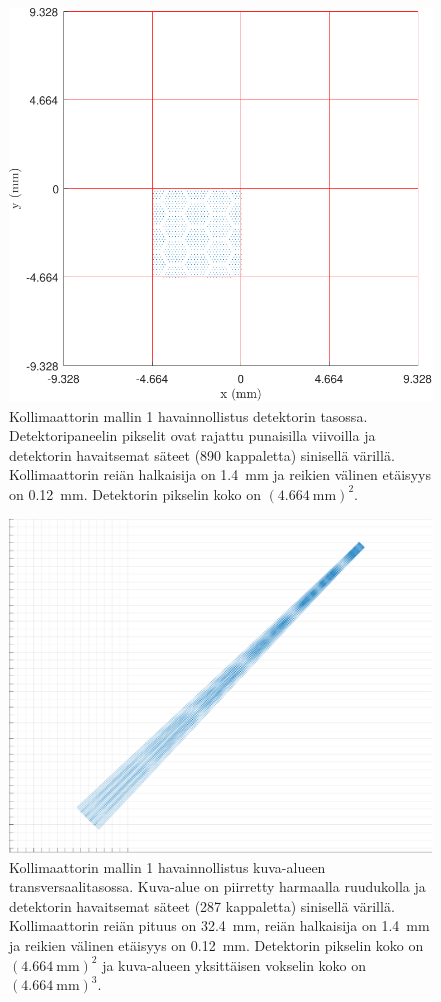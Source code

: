 \begin{figure}[H]
    \centering
    \captionsetup{width=.9\linewidth}
    \includegraphics[width=.9\linewidth]{kuvat/malli1_2D.pdf}
    \caption{Kollimaattorin mallin 1 havainnollistus detektorin tasossa. Detektoripaneelin pikselit ovat rajattu punaisilla viivoilla ja detektorin havaitsemat säteet (890 kappaletta) sinisellä värillä. Kollimaattorin reiän halkaisija on \qty{1.4}{\milli\meter} ja reikien välinen etäisyys on \qty{0.12}{\milli\meter}. Detektorin pikselin koko on $(\qty{4.664}{\milli\meter})^2$.}
    \label{fig:ray1_2D}
\end{figure}
\begin{figure}[H]
    \centering
    \captionsetup{width=.9\linewidth}
    \includegraphics[width=.9\linewidth]{kuvat/malli1_3D.pdf}
    \caption{Kollimaattorin mallin 1 havainnollistus kuva-alueen transversaalitasossa. Kuva-alue on piirretty harmaalla ruudukolla ja detektorin havaitsemat säteet (287 kappaletta) sinisellä värillä. Kollimaattorin reiän pituus on \qty{32.4}{\milli\meter}, reiän halkaisija on \qty{1.4}{\milli\meter} ja reikien välinen etäisyys on \qty{0.12}{\milli\meter}. Detektorin pikselin koko on $(\qty{4.664}{\milli\meter})^2$ ja kuva-alueen yksittäisen vokselin koko on $(\qty{4.664}{\milli\meter})^{3}$.}
    \label{fig:ray1_3D}
\end{figure}
